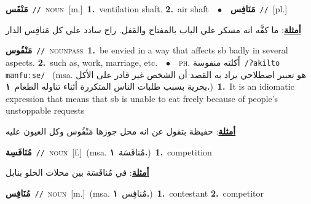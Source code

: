 \documentclass[10pt,a4paper,twoside]{article} %
\begin{document}
\begin{multicols}{2}
{\setlength\topsep{0pt}\textbf{\foreignlanguage{arabic}{مَنْفَس}}\ {\color{gray}\texttt{//}\color{black}}\ \textsc{noun}\ [m.]\ \textbf{1.}~ventilation shaft.  \textbf{2.}~air shaft\ \ $\bullet$\ \ \setlength\topsep{0pt}\textbf{\foreignlanguage{arabic}{مَنَافِس}}\ {\color{gray}\texttt{//}\color{black}}\ [pl.]\  \begin{flushright}\color{gray}\foreignlanguage{arabic}{\textbf{\underline{\foreignlanguage{arabic}{أمثلة}}}: ما كفَّه انه مسكر علي الباب بالمفتاح والقفل. راح سادد علي كل مَنافِس الدار}\end{flushright}\color{black}} \vspace{2mm}

{\setlength\topsep{0pt}\textbf{\foreignlanguage{arabic}{مَنْفُوس}}\ {\color{gray}\texttt{//}\color{black}}\ \textsc{noun\textunderscore pass}\ \textbf{1.}~be envied in a way that affects sb badly in several aspects.  \textbf{2.}~such as, work, marriage, etc.\ \ $\bullet$\ \ \textsc{ph.} \color{gray} \foreignlanguage{arabic}{أَكلته منفوسة}\color{black}\ {\color{gray}\texttt{/{\sffamily ʔakilto manfuːse}/}\color{black}}\ \color{gray} (msa. \foreignlanguage{arabic}{هو تعبير اصطلاحي يراد به القصد أن الشخص غير قادر على الأكل بحرية بسبب طلبات الناس المتكررة أثناء تناوله الطعام}~\foreignlanguage{arabic}{\textbf{١.}})\color{black}\ \textbf{1.}~It is an idiomatic expression that means that sb is unable to eat freely because of people's unstoppable requests\  \begin{flushright}\color{gray}\foreignlanguage{arabic}{\textbf{\underline{\foreignlanguage{arabic}{أمثلة}}}: حفيظة بتقول عن انه محل جوزها مَنْفُوس وكل العيون عليه}\end{flushright}\color{black}} \vspace{2mm}

{\setlength\topsep{0pt}\textbf{\foreignlanguage{arabic}{مُنَافَسِة}}\ {\color{gray}\texttt{//}\color{black}}\ \textsc{noun}\ [f.]\ \color{gray}(msa. \foreignlanguage{arabic}{مُنافَسَة}~\foreignlanguage{arabic}{\textbf{١.}})\color{black}\ \textbf{1.}~competition\  \begin{flushright}\color{gray}\foreignlanguage{arabic}{\textbf{\underline{\foreignlanguage{arabic}{أمثلة}}}: في مُنافَسَة بين محلات الحلو بنابل}\end{flushright}\color{black}} \vspace{2mm}

{\setlength\topsep{0pt}\textbf{\foreignlanguage{arabic}{مُنَافِس}}\ {\color{gray}\texttt{//}\color{black}}\ \textsc{noun}\ [m.]\ \color{gray}(msa. \foreignlanguage{arabic}{مُنافِس}~\foreignlanguage{arabic}{\textbf{١.}})\color{black}\ \textbf{1.}~contestant  \textbf{2.}~competitor\ } \vspace{2mm}


\end{multicols}
\end{document}
